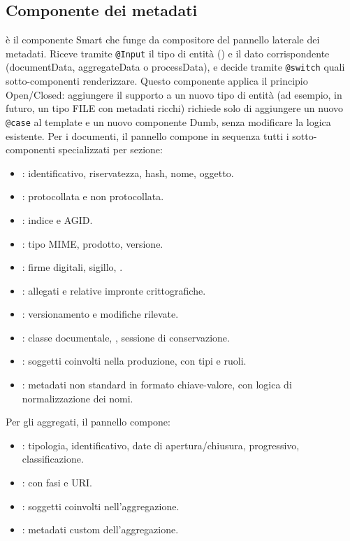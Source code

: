 \subsection{Componente dei metadati}
 è il componente Smart che funge da compositore del pannello laterale dei metadati. Riceve tramite \texttt{@Input} il tipo di entità () e il dato corrispondente (documentData, aggregateData o processData), e decide tramite \texttt{@switch} quali sotto-componenti renderizzare.
Questo componente applica il principio Open/Closed: aggiungere il supporto a un nuovo tipo di entità (ad esempio, in futuro, un tipo FILE con metadati ricchi) richiede solo di aggiungere un nuovo \texttt{@case} al template e un nuovo componente Dumb, senza modificare la logica esistente.
Per i documenti, il pannello compone in sequenza tutti i sotto-componenti specializzati per sezione:
\begin{itemize}
    \item {}: identificativo, riservatezza, hash, nome, oggetto.
    \item {}:  protocollata e non protocollata.
    \item {}: indice e  AGID.
    \item {}: tipo MIME, prodotto, versione.
    \item {}: firme digitali, sigillo, .
    \item {}: allegati e relative impronte crittografiche.
    \item {}: versionamento e modifiche rilevate.
    \item {}: classe documentale,  , sessione di conservazione.
    \item {}: soggetti coinvolti nella produzione, con tipi e ruoli.
    \item {}: metadati non standard in formato chiave-valore, con logica di normalizzazione dei nomi.
\end{itemize}
Per gli aggregati, il pannello compone:
\begin{itemize}
    \item {}: tipologia, identificativo, date di apertura/chiusura, progressivo, classificazione.
    \item {}:  con fasi e URI.
    \item {}: soggetti coinvolti nell'aggregazione.
    \item {}: metadati custom dell'aggregazione.
\end{itemize}

